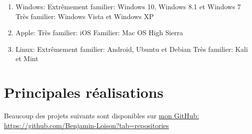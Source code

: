 \documentclass{article}
\begin{document}
		\begin{enumerate}

			\item Windows:
				\subitem Extrêmement familier: Windows 10, Windows 8.1 et Windows 7
				\subitem Très familier: Windows Vista et Windows XP

			\item Apple:
				\subitem Très familier: iOS
				\subitem Familier: Mac OS High Sierra

			\item Linux:
				\subitem Extrêmement familier: Android, Ubuntu et Debian
				\subitem Très familier: Kali et Mint

		\end{enumerate}

	\section{Principales réalisations}

		Beaucoup des projets suivants sont disponibles sur \href{https://github.com/Benjamin-Loison?tab=repositories}{mon GitHub: https://github.com/Benjamin-Loison?tab=repositories}
\end{document}
